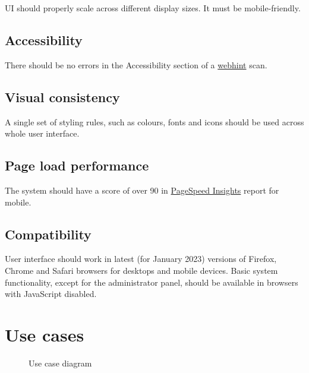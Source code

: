 UI should properly scale across different display sizes. It must be mobile-friendly.

\subsection{Accessibility}

There should be no errors in the Accessibility section of a \href{https://webhint.io/}{webhint} scan.

\subsection{Visual consistency}

A single set of styling rules, such as colours, fonts and icons should be used across whole user interface.

\subsection{Page load performance}

The system should have a score of over 90 in \href{https://pagespeed.web.dev}{PageSpeed Insights} report for mobile.

\subsection{Compatibility}

User interface should work in latest (for January 2023) versions of Firefox, Chrome and Safari browsers for desktops and mobile devices. Basic system functionality, except for the administrator panel, should be available in browsers with JavaScript disabled.

\section{Use cases}

\begin{figure}
	\centering
	
	\caption{Use case diagram}
\end{figure}
